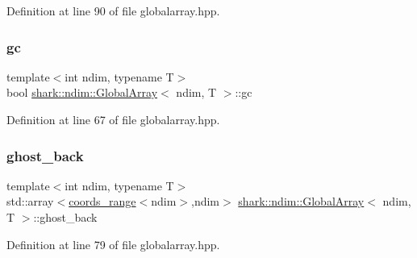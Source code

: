 Definition at line 90 of file globalarray.\+hpp.

\hypertarget{classshark_1_1ndim_1_1_global_array_a100f4d523420deffde330079df7501e2}{}\label{classshark_1_1ndim_1_1_global_array_a100f4d523420deffde330079df7501e2} 
\subsubsection{\texorpdfstring{gc}{gc}}
{\footnotesize\ttfamily template$<$int ndim, typename T$>$ \\
bool \hyperlink{classshark_1_1ndim_1_1_global_array}{shark\+::ndim\+::\+Global\+Array}$<$ ndim, T $>$\+::gc\hspace{0.3cm}{\ttfamily [private]}}



Definition at line 67 of file globalarray.\+hpp.

\hypertarget{classshark_1_1ndim_1_1_global_array_a97eb47a8cd80d98627706e673259a310}{}\label{classshark_1_1ndim_1_1_global_array_a97eb47a8cd80d98627706e673259a310} 
\subsubsection{\texorpdfstring{ghost\+\_\+back}{ghost\_back}}
{\footnotesize\ttfamily template$<$int ndim, typename T$>$ \\
std\+::array$<$\hyperlink{structshark_1_1ndim_1_1coords__range}{coords\+\_\+range}$<$ndim$>$,ndim$>$ \hyperlink{classshark_1_1ndim_1_1_global_array}{shark\+::ndim\+::\+Global\+Array}$<$ ndim, T $>$\+::ghost\+\_\+back\hspace{0.3cm}{\ttfamily [private]}}



Definition at line 79 of file globalarray.\+hpp.

\hypertarget{classshark_1_1ndim_1_1_global_array_a48ce861293f294f003ef16ebd49eb942}{}\label{classshark_1_1ndim_1_1_global_array_a48ce861293f294f003ef16ebd49eb942} 
